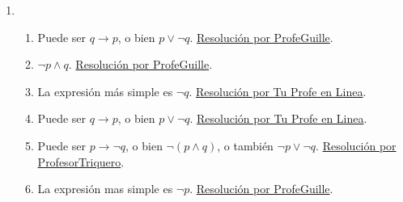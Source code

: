 \documentclass[a4paper]{article}
\newcommand{\exercise}{\item}
\newcommand{\then}{\to}
\begin{document}
\begin{enumerate}
\begin{enumerate} [label=(\alph*)]
		\item La \href{https://www.wolframalpha.com/input?i=%28not+p+or+not+q%29+%3C%3D%3E+%28p+and+q%29}{tabla de verdad} revela que es una contradicción. Por lo tanto, las proposiciones no son equivalentes.
		\item La \href{https://www.wolframalpha.com/input?i=%28p+and+not+q%29+%3C%3D%3E+%28not+p+or+q%29}{tabla de verdad} revela que es una contradicción. Por lo tanto, las proposiciones no son equivalentes. También pueden ver la \href{https://youtu.be/NZSuHeymu4M?t=639}{resolución por Tu Profe en Linea}.
		\item La \href{https://www.wolframalpha.com/input?i=%28p+%3D%3E+%28q+or+r%29%29+%3C%3D%3E+%28%28p+and+r%29+%3D%3E+%5Cneg+q%29}{tabla de verdad} revela que es una contingencia. Por lo tanto, las proposiciones no son equivalentes. Para más detalles ver la \href{https://www.youtube.com/live/-yHPDgU-lfE?feature=share&t=578}{resolución por Julio Profe}.
		\item La \href{https://www.wolframalpha.com/input?i=not+%28%28p+and+q%29+%3D%3E+not+r%29+%3C%3D%3E++%28%28p+and+q%29+or+r%29}{tabla de verdad} revela que es una contingencia. Por lo tanto, no son equivalentes. 
		\item La \href{https://www.wolframalpha.com/input?i=truth+table%3A+%28p+%3D%3E+%28q+and+r+and+s%29%29+%3C%3D%3E+%28%28p+%3D%3E+q%29+and+%28p+%3D%3E+r%29+and+%28p+%3D%3E+s%29%29}{tabla de verdad} revela que es una tautología. Por lo tanto, son equivalentes. Esta regla de equivalencia no tiene nombre.
\end{enumerate}\exercise\begin{enumerate} [label=(\alph*)]		\item Puede ser $q \then p$, o bien $p \lor \neg q$. \href{https://youtu.be/5r8S-wMJq7I}{Resolución por ProfeGuille}.
		\item $\neg p \land q$. \href{https://youtu.be/Ayk4qXcoiOM}{Resolución por ProfeGuille}.
		\item La expresión más simple es $\neg q$. \href{https://youtu.be/BOydu7cpv70?t=884}{Resolución por Tu Profe en Linea}.
		\item Puede ser $q \then p$, o bien $p \lor \neg q$. \href{https://youtu.be/BOydu7cpv70?t=334}{Resolución por Tu Profe en Linea}.
		\item Puede ser $p \then \neg q$, o bien $\neg ( p \land q )$, o también $\neg p \lor \neg q$. \href{https://youtu.be/p005yi28rgk?t=392}{Resolución por ProfesorTriquero}.
		\item La expresión mas simple es $\neg p$. \href{https://youtu.be/UZDME4cZxNc}{Resolución por ProfeGuille}.

\end{enumerate}
\end{enumerate}
\end{document}

